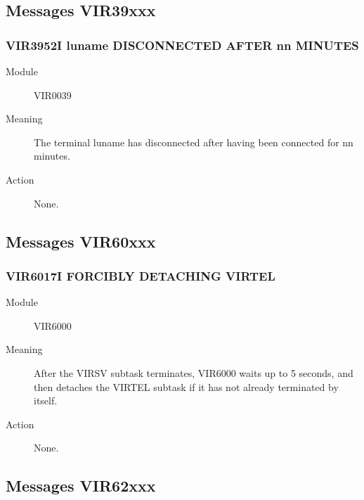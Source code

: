\documentclass[letterpaper,10pt,english]{sphinxmanual}
\begin{document}
\subsection{Messages VIR39xxx}
\label{\detokenize{messages:messages-vir39xxx}}

\subsubsection{VIR3952I luname DISCONNECTED AFTER nn MINUTES}
\label{\detokenize{messages:vir3952i-luname-disconnected-after-nn-minutes}}\begin{description}
\item[{Module}] \leavevmode
VIR0039

\item[{Meaning}] \leavevmode
The terminal luname has disconnected after having been connected for nn minutes.

\item[{Action}] \leavevmode
None.

\end{description}


\subsection{Messages VIR60xxx}
\label{\detokenize{messages:messages-vir60xxx}}

\subsubsection{VIR6017I FORCIBLY DETACHING VIRTEL}
\label{\detokenize{messages:vir6017i-forcibly-detaching-virtel}}\begin{description}
\item[{Module}] \leavevmode
VIR6000

\item[{Meaning}] \leavevmode
After the VIRSV subtask terminates, VIR6000 waits up to 5 seconds, and then detaches the VIRTEL subtask if it has not already terminated by itself.

\item[{Action}] \leavevmode
None.

\end{description}


\subsection{Messages VIR62xxx}
\label{\detokenize{messages:messages-vir62xxx}}
\end{document}

